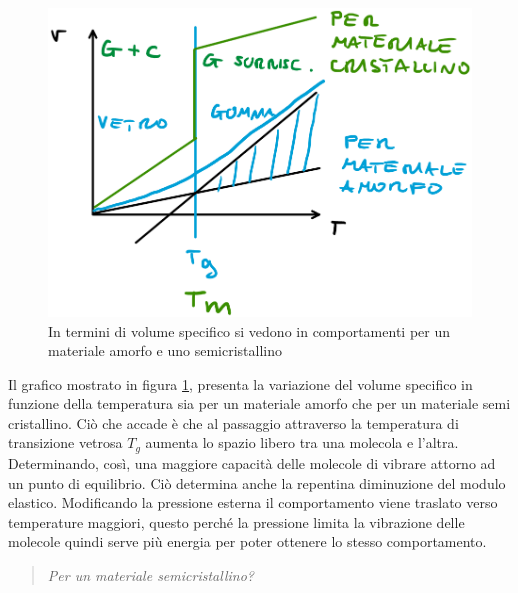 \begin{figure}
\centering
\includegraphics[width = \textwidth]{gfx/VolSpec}
\caption{In termini di volume specifico si vedono in comportamenti per un materiale amorfo e uno semicristallino}
\label{fig:VolSpec}
\end{figure}

Il grafico mostrato in figura \ref{fig:VolSpec}, presenta la variazione del volume specifico in funzione della temperatura sia per un materiale amorfo che per un materiale semi cristallino.
Ciò che accade è che al passaggio attraverso la temperatura di transizione vetrosa $T_g$ aumenta lo spazio libero tra una molecola e l'altra. Determinando, così, una maggiore capacità delle molecole di vibrare attorno ad un punto di equilibrio. Ciò determina anche la repentina diminuzione del modulo elastico. 
Modificando la pressione esterna il comportamento viene traslato verso temperature maggiori, questo perché la pressione limita la vibrazione delle molecole quindi serve più energia per poter ottenere lo stesso comportamento. 

\begin{quote}
\emph{Per un materiale semicristallino?}
\end{quote}


